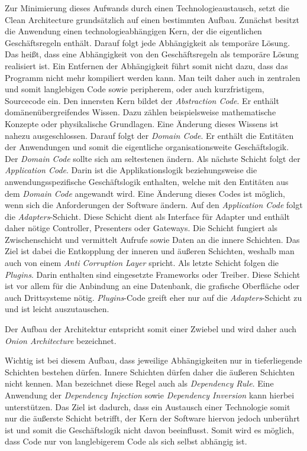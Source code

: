 Zur Minimierung dieses Aufwands durch einen Technologieaustausch, setzt die Clean Architecture grundsätzlich auf einen bestimmten Aufbau.
Zunächst besitzt die Anwendung einen technologieabhängigen Kern, der die eigentlichen Geschäftsregeln enthält.
Darauf folgt jede Abhängigkeit als temporäre Lösung. Das heißt, dass eine Abhängigkeit von den Geschäftsregeln als temporäre Lösung realisiert ist.
Ein Entfernen der Abhängigkeit führt somit nicht dazu, dass das Programm nicht mehr kompiliert werden kann.
Man teilt daher auch in zentralen und somit langlebigen Code sowie peripherem, oder auch kurzfristigem, Sourcecode ein.
Den innersten Kern bildet der \textit{Abstraction Code}. 
Er enthält domänenübergreifendes Wissen. 
Dazu zählen beispielsweise mathematische Konzepte oder physikalische Grundlagen.
Eine Änderung dieses Wissens ist nahezu ausgeschlossen.
Darauf folgt der \textit{Domain Code}.
Er enthält die Entitäten der Anwendungen und somit die eigentliche organisationsweite Geschäftslogik.
Der \textit{Domain Code} sollte sich am seltestenen ändern.
Als nächste Schicht folgt der \textit{Application Code}.
Darin ist die Applikationslogik beziehungsweise die anwendungsspezifische Geschäftslogik enthalten, welche mit den Entitäten aus dem \textit{Domain Code} angewandt wird.
Eine Änderung dieses Codes ist möglich, wenn sich die Anforderungen der Software ändern.
Auf den \textit{Application Code} folgt die \textit{Adapters}-Schicht.
Diese Schicht dient als Interface für Adapter und enthält daher nötige Controller, Presenters oder Gateways.
Die Schicht fungiert als Zwischenschicht und vermittelt Aufrufe sowie Daten an die innere Schichten.
Das Ziel ist dabei die Entkopplung der inneren und äußeren Schichten, weshalb man auch von einem \textit{Anti Corruption Layer} spricht.
Als letzte Schicht folgen die \textit{Plugins}.
Darin enthalten sind eingesetzte Frameworks oder Treiber.
Diese Schicht ist vor allem für die Anbindung an eine Datenbank, die grafische Oberfläche oder auch Drittsysteme nötig.
\textit{Plugins}-Code greift eher nur auf die \textit{Adapters}-Schicht zu und ist leicht auszutauschen.

Der Aufbau der Architektur entspricht somit einer Zwiebel und wird daher auch \textit{Onion Architecture} bezeichnet.

Wichtig ist bei diesem Aufbau, dass jeweilige Abhängigkeiten nur in tieferliegende Schichten bestehen dürfen.
Innere Schichten dürfen daher die äußeren Schichten nicht kennen.
Man bezeichnet diese Regel auch als \textit{Dependency Rule}.
Eine Anwendung der \textit{Dependency Injection} sowie \textit{Dependency Inversion} kann hierbei unterstützen.
Das Ziel ist dadurch, dass ein Austausch einer Technologie somit nur die äußerste Schicht betrifft, der Kern der Software hiervon jedoch unberührt ist und somit die Geschäftslogik nicht davon beeinflusst.
Somit wird es möglich, dass Code nur von langlebigerem Code als sich selbst abhängig ist.

